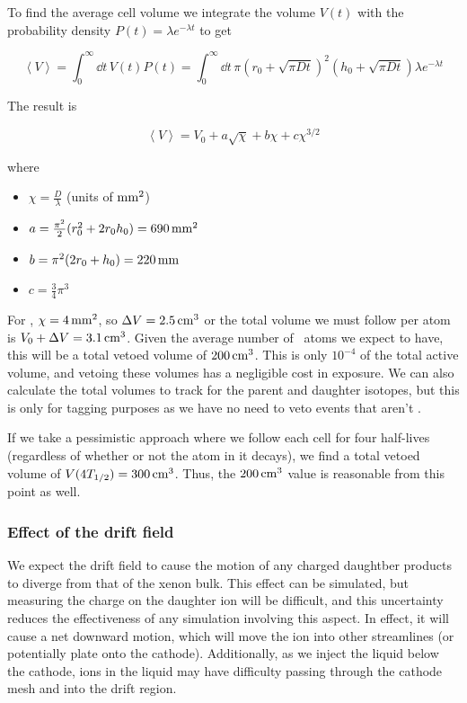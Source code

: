 To find the average cell volume we integrate the volume $V(t)$ with the probability density $P(t) = \lambda e^{-\lambda t}$ to get

\begin{equation}
\left< V \right> = \int_0^{\infty} \dd t\,V(t) P(t) = \int_0^{\infty} \dd t\,\pi(r_0 + \sqrt{\pi Dt})^2(h_0 + \sqrt{\pi Dt})\lambda e^{-\lambda t}
\end{equation}

The result is

\begin{equation}
\left< V \right> = V_0 + a\sqrt{\chi} + b\chi + c\chi^{3/2}
\end{equation}

where
\begin{itemize}
    \item $\chi = \frac{D}{\lambda}$ (units of $\mathrm{mm^2}$)
    \item $a = \frac{\pi^{2}}{2} (r_0^2+2 r_0 h_0) = 690\,\mathrm{mm^2}$
    \item $b = \pi^2 (2r_0 + h_0) = 220\,\mathrm{mm}$
    \item $c = \frac{3}{4} \pi^{3}$
\end{itemize}

For \Pb, $\chi = 4\,\mathrm{mm^2}$, so $\Delta V = 2.5\,\mathrm{cm^3}$ or the total volume we must follow per atom is $V_0 + \Delta V = 3.1\,\mathrm{cm^3}$. Given the average number of \Pb~atoms we expect to have, this will be a total vetoed volume of $200\,\mathrm{cm^3}$. This is only $10^{-4}$ of the total active volume, and vetoing these volumes has a negligible cost in exposure. We can also calculate the total volumes to track for the parent and daughter isotopes, but this is only for tagging purposes as we have no need to veto events that aren't \Pb.

If we take a pessimistic approach where we follow each cell for four half-lives (regardless of whether or not the atom in it decays), we find a total vetoed volume of $V(4T_{1/2}) = 300\,\mathrm{cm^3}$. Thus, the $200\,\mathrm{cm^3}$ value is reasonable from this point as well.

\subsubsection{Effect of the drift field}

We expect the drift field to cause the motion of any charged daughtber products to diverge from that of the xenon bulk. This effect can be simulated, but measuring the charge on the daughter ion will be difficult, and this uncertainty reduces the effectiveness of any simulation involving this aspect. In effect, it will cause a net downward motion, which will move the ion into other streamlines (or potentially plate onto the cathode). Additionally, as we inject the liquid below the cathode, ions in the liquid may have difficulty passing through the cathode mesh and into the drift region.


